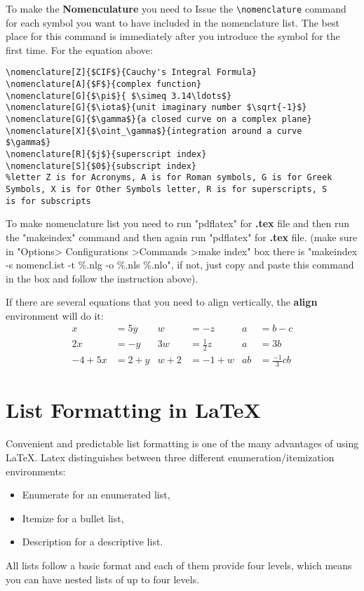 To make the \textbf{Nomenculature } you need to Issue the \verb|\nomenclature| command for each symbol you want to have included in the nomenclature list. The best place for this command is immediately after you introduce the symbol for
the first time. For the equation above:

\begin{verbatim}
\nomenclature[Z]{$CIF$}{Cauchy's Integral Formula}                                
\nomenclature[A]{$F$}{complex function}                                                  
\nomenclature[G]{$\pi$}{ $\simeq 3.14\ldots$}                                             
\nomenclature[G]{$\iota$}{unit imaginary number $\sqrt{-1}$}                      
\nomenclature[G]{$\gamma$}{a closed curve on a complex plane}  
\nomenclature[X]{$\oint_\gamma$}{integration around a curve 
$\gamma$} 
\nomenclature[R]{$j$}{superscript index}                                                       
\nomenclature[S]{$0$}{subscript index}
%letter Z is for Acronyms, A is for Roman symbols, G is for Greek 
Symbols, X is for Other Symbols letter, R is for superscripts, S 
is for subscripts
\end{verbatim}

To make nomenclature list you need to run "pdflatex" for \textbf{.tex} file and then run the "makeindex" command and then again run "pdflatex" for \textbf{.tex} file. (make sure in "Options> Configurations >Commands >make index" box there is "makeindex -s nomencl.ist -t \%.nlg -o \%.nls \%.nlo", if not, just copy and paste this command in the box and follow the instruction above).


If there are several equations that you need to align vertically, the \textbf{align} environment will do it:
\begin{align*}
	x&=5y           &  w &=-z              &  a&=b-c\\
	2x&=-y         &  3w&=\frac{1}{2}z   &  a&=3b\\
	-4 + 5x&=2+y   &  w+2&=-1+w          &  ab&=\frac{-1}{3}cb
\end{align*}


\vspace{0.5cm}

\section{List Formatting in \LaTeX}
\label{section 2.3}
Convenient and predictable list formatting is one of the many advantages of using \LaTeX . Latex distinguishes between three different enumeration/itemization environments: 
%
\begin{itemize}
	\item Enumerate for an enumerated list,
	\item Itemize for a bullet list,
	\item Description for a descriptive list.
\end{itemize}
All lists follow a basic format and each of them provide four levels, which means you can have nested lists of up to four levels.

